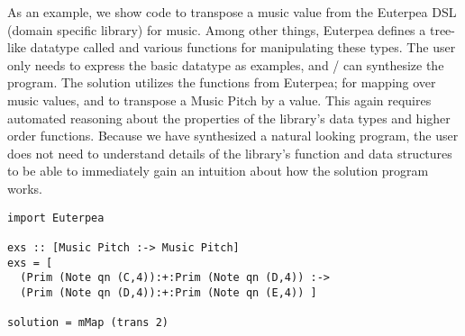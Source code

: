 As an example, we show code to transpose a music value from the Euterpea DSL (domain specific library) for music\cite{euterpea}.
Among other things, Euterpea defines a tree-like datatype called  and various functions for manipulating these types.
The user only needs to express the basic datatype as examples, and \ourTool/ can synthesize the  program.
The solution utilizes the functions from Euterpea;  for mapping over music values, and  to transpose a Music Pitch by a value.
This again requires automated reasoning about the properties of the library's data types and higher order functions.
Because we have synthesized a natural looking program, the user does not need to understand details of the library's function and data structures to be able to immediately gain an intuition about how the solution program works.

\begin{lstlisting}
import Euterpea

exs :: [Music Pitch :-> Music Pitch]
exs = [
  (Prim (Note qn (C,4)):+:Prim (Note qn (D,4)) :->
  (Prim (Note qn (D,4)):+:Prim (Note qn (E,4)) ]
        
solution = mMap (trans 2)
\end{lstlisting}

